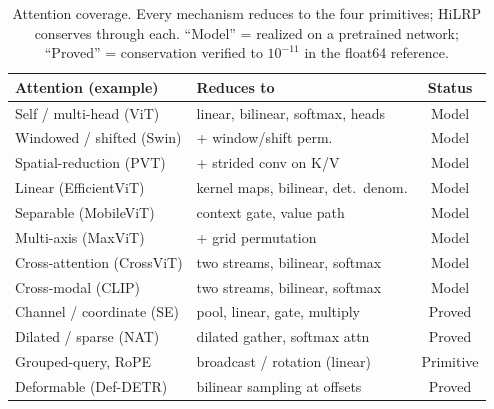\documentclass[lettersize,journal]{IEEEtran}
\begin{document}
\begin{table}[h]
  \centering
  \caption{Attention coverage. Every mechanism reduces to the four primitives; HiLRP conserves through each. ``Model'' = realized on a pretrained network; ``Proved'' = conservation verified to $10^{-11}$ in the float64 reference.}
  \label{tab:attn-coverage}
  \setlength{\tabcolsep}{4pt}
  \footnotesize
  \begin{tabular}{l l c}
    \toprule
    Attention (example) & Reduces to & Status \\
    \midrule
    Self / multi-head (ViT) & linear, bilinear, softmax, heads & Model \\
    Windowed / shifted (Swin) & \;\; + window/shift perm. & Model \\
    Spatial-reduction (PVT) & \;\; + strided conv on K/V & Model \\
    Linear (EfficientViT) & kernel maps, bilinear, det.\ denom. & Model \\
    Separable (MobileViT) & context gate, value path & Model \\
    Multi-axis (MaxViT) & \;\; + grid permutation & Model \\
    Cross-attention (CrossViT) & two streams, bilinear, softmax & Model \\
    Cross-modal (CLIP) & two streams, bilinear, softmax & Model \\
    Channel / coordinate (SE) & pool, linear, gate, multiply & Proved \\
    Dilated / sparse (NAT) & dilated gather, softmax attn & Proved \\
    Grouped-query, RoPE & broadcast / rotation (linear) & Primitive \\
    Deformable (Def-DETR) & bilinear sampling at offsets & Proved \\
    \bottomrule
  \end{tabular}
\end{table}
\end{document}
